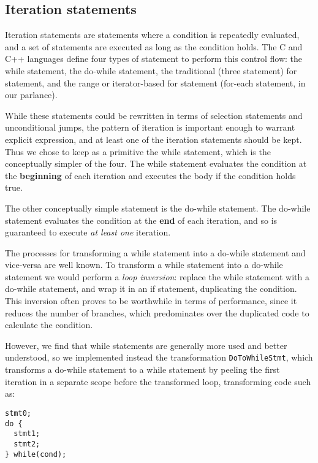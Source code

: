 \subsection{Iteration statements}\label{sec:subset-iteration}

Iteration statements are statements where a condition is repeatedly evaluated, and a set of statements are executed as long as the condition holds. The C and C++ languages define four types of statement to perform this control flow: the while statement, the do-while statement, the traditional (three statement) for statement, and the range or iterator-based for statement (for-each statement, in our parlance).

While these statements could be rewritten in terms of selection statements and unconditional jumps, the pattern of iteration is important enough to warrant explicit expression, and at least one of the iteration statements should be kept. Thus we chose to keep as a primitive the while statement, which is the conceptually simpler of the four. The while statement evaluates the condition at the \textbf{beginning} of each iteration and executes the body if the condition holds true.

The other conceptually simple statement is the do-while statement. The do-while statement evaluates the condition at the \textbf{end} of each iteration, and so is guaranteed to execute \textit{at least one} iteration.

The processes for transforming a while statement into a do-while statement and vice-versa are well known. To transform a while statement into a do-while statement we would perform a \textit{loop inversion}: replace the while statement with a do-while statement, and wrap it in an if statement, duplicating the condition. This inversion often proves to be worthwhile in terms of performance, since it reduces the number of branches, which predominates over the duplicated code to calculate the condition.

However, we find that while statements are generally more used and better understood, so we implemented instead the transformation \verb|DoToWhileStmt|, which transforms a do-while statement to a while statement by peeling the first iteration in a separate scope before the transformed loop, transforming code such as:

\begin{lstlisting}
stmt0;
do {
  stmt1;
  stmt2;
} while(cond);
\end{lstlisting}

